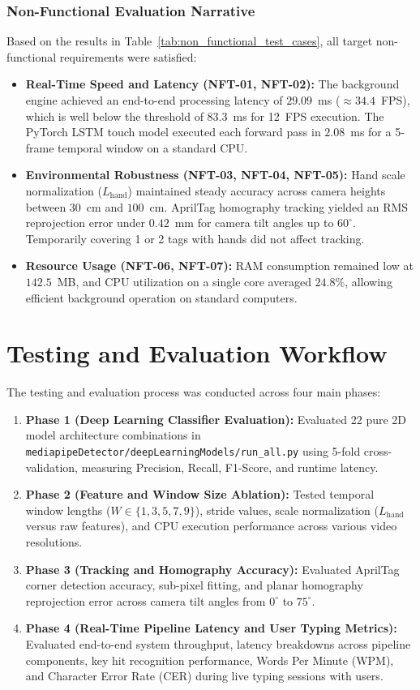 \subsubsection{Non-Functional Evaluation Narrative}
Based on the results in Table~\ref{tab:non_functional_test_cases}, all target non-functional requirements were satisfied:
\begin{itemize}
    \item \textbf{Real-Time Speed and Latency (NFT-01, NFT-02):} The background engine achieved an end-to-end processing latency of $29.09$~ms ($\approx 34.4$~FPS), which is well below the threshold of $83.3$~ms for 12~FPS execution. The PyTorch LSTM touch model executed each forward pass in $2.08$~ms for a 5-frame temporal window on a standard CPU.
    \item \textbf{Environmental Robustness (NFT-03, NFT-04, NFT-05):} Hand scale normalization ($L_{\text{hand}}$) maintained steady accuracy across camera heights between $30$~cm and $100$~cm. AprilTag homography tracking yielded an RMS reprojection error under $0.42$~mm for camera tilt angles up to $60^\circ$. Temporarily covering 1 or 2 tags with hands did not affect tracking.
    \item \textbf{Resource Usage (NFT-06, NFT-07):} RAM consumption remained low at $142.5$~MB, and CPU utilization on a single core averaged $24.8\%$, allowing efficient background operation on standard computers.
\end{itemize}

\section{Testing and Evaluation Workflow}
\label{sec:test_workflow}
The testing and evaluation process was conducted across four main phases:
\begin{enumerate}
    \item \textbf{Phase 1 (Deep Learning Classifier Evaluation):} Evaluated 22 pure 2D model architecture combinations in \texttt{mediapipeDetector/}\linebreak[1]\texttt{deepLearningModels/}\linebreak[1]\texttt{run\_all.py} using 5-fold cross-validation, measuring Precision, Recall, F1-Score, and runtime latency.
    \item \textbf{Phase 2 (Feature and Window Size Ablation):} Tested temporal window lengths ($W \in \{1, 3, 5, 7, 9\}$), stride values, scale normalization ($L_{\text{hand}}$ versus raw features), and CPU execution performance across various video resolutions.
    \item \textbf{Phase 3 (Tracking and Homography Accuracy):} Evaluated AprilTag corner detection accuracy, sub-pixel fitting, and planar homography reprojection error across camera tilt angles from $0^\circ$ to $75^\circ$.
    \item \textbf{Phase 4 (Real-Time Pipeline Latency and User Typing Metrics):} Evaluated end-to-end system throughput, latency breakdowns across pipeline components, key hit recognition performance, Words Per Minute (WPM), and Character Error Rate (CER) during live typing sessions with users.
\end{enumerate}

